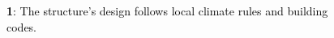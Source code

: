 ﻿%
\begin{figure}[H]
	\centering
	
	\vspace*{\baselineskip}%
	\caption*{%
		\footnotesize
		\textcolor{black}{%
			\textnormal{%
				\textbf{1}:
				The structure's design follows local climate rules and building codes.
			}
		}
	}
	\label{
		fig:algae-bio-facade-system--features-01
	}
\end{figure}
